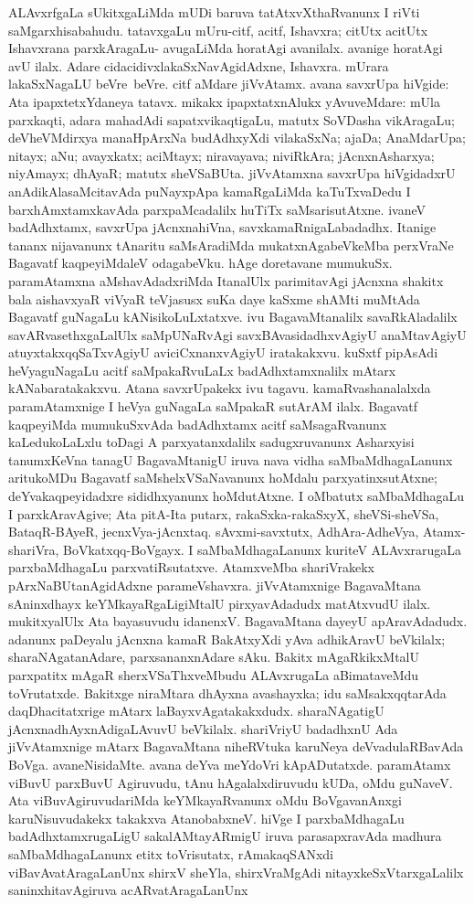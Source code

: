 ALAvxrfgaLa sUkitxgaLiMda mUDi baruva tatAtxvXthaRvanunx I riVti saMgarxhisa\-bahudu. tatavxgaLu mUru-citf, acitf, Ishavxra; citUtx acitUtx Ishavxrana parxkAra\-gaLu- avugaLiMda horatAgi avanilalx. avanige horatAgi avU ilalx. Adare cidacidivxlakaSxNavAgidAdxne, Ishavxra. mUrara lakaSxNagaLU \hbox{beVre beVre}. citf aMdare jiVvAtamx. avana savxrUpa hiVgide: Ata ipapxtetxYdaneya tatavx. mikakx ipapxtatxnAlukx yAvuveMdare: mUla parxkaqti, adara mahadAdi sapatxvikaqtigaLu, matutx SoVDasha vikAragaLu; deVheVMdirxya manaHpArxNa budAdhxyXdi vilakaSxNa; ajaDa; AnaMdarUpa; nitayx; aNu; avayxkatx; aciMtayx; niravayava; niviRkAra; jAcnxnAsharxya; niyAmayx; dhAyaR; matutx sheVSaBUta. jiVvAtamxna savxrUpa hiVgidadxrU anAdikAlasaMcitavAda puNayxpApa kamaRgaLiMda kaTuTxvaDedu I barxhAmxtamxkavAda parxpaMcadalilx huTiTx saMsarisutAtxne. ivaneV badAdhxtamx, savxrUpa jAcnxnahiVna, savxkamaRnigaLabadadhx. Itanige tananx nijavanunx tAnaritu saMsAradiMda mukatxnAgabeVkeMba perxVraNe Bagavatf kaqpeyiMdaleV odagabeVku. hAge doretavane mumukuSx. paramAtamxna aMshavAdadxriMda ItanalUlx parimitavAgi jAcnxna shakitx bala aishavxyaR viVyaR teVjasusx suKa daye kaSxme shAMti muMtAda Bagavatf guNagaLu kANisikoLuLxtatxve. ivu BagavaMtanalilx savaRkAladalilx savARvasethxgaLalUlx saMpUNaRvAgi savxBAvasidadhxvAgiyU anaMtavAgiyU atuyxtakxqqSaTxvAgiyU aviciCxnanxvAgiyU iratakakxvu. kuSxtf pipAsAdi heVyaguNagaLu acitf saMpakaRvuLaLx badAdhxtamxnalilx mAtarx kANabaratakakxvu. Atana savxrUpakekx ivu tagavu. kamaRvashanalalxda paramAtamxnige I heVya guNagaLa saMpakaR sutArAM ilalx. Bagavatf kaqpeyiMda mumukuSxvAda badAdhxtamx acitf saMsagaRvanunx kaLedukoLaLxlu toDagi A parxyatanxdalilx sadugxruvanunx Asharxyisi tanumxKeVna tanagU BagavaMtanigU iruva nava vidha saMbaMdhagaLanunx aritukoMDu Bagavatf saMshelxVSaNavanunx hoMdalu parxyatinxsutAtxne; deYvakaqpeyidadxre sididhxyanunx hoMdutAtxne. I oMbatutx saMbaMdhagaLu I parxkAravAgive; Ata pitA-Ita putarx, rakaSxka-rakaSxyX, sheVSi-sheVSa, BataqR-BAyeR, jecnxVya-jAcnxtaq. sAvxmi-savxtutx, AdhAra-AdheVya, Atamx-shariVra, BoVkatxqq-BoVgayx. I saMbaMdhagaLanunx kuriteV ALAvxrarugaLa parxbaMdhagaLu parxvatiRsutatxve. AtamxveMba shariVrakekx pArxNaBUtanAgidAdxne parameVshavxra. jiVvAtamxnige BagavaMtana sAninxdhayx keYMkayaRgaLigiMtalU pirxyavAdadudx matAtxvudU ilalx. mukitxyalUlx Ata bayasuvudu idanenxV. BagavaMtana dayeyU apAravAdadudx. adanunx paDeyalu jAcnxna kamaR BakAtxyXdi yAva adhikAravU beVkilalx; sharaNAgatanAdare, parxsananxnAdare sAku. Bakitx mAgaRkikxMtalU parxpatitx mAgaR sherxVSaThxveMbudu ALAvxrugaLa aBimataveMdu toVrutatxde. Bakitxge niraMtara dhAyxna avashayxka; idu saMsakxqqtarAda daqDhacitatxrige mAtarx laBayxvAgatakakxdudx. sharaNAgatigU jAcnxnadhAyxnAdigaLAvuvU beVkilalx. shariVriyU badadhxnU Ada jiVvAtamxnige mAtarx BagavaMtana niheRVtuka karuNeya deVvadulaRBavAda BoVga. avaneNisidaMte. avana deYva meYdoVri kApADutatxde. paramAtamx viBuvU parxBuvU Agiruvudu, tAnu hAgalalxdiruvudu kUDa, oMdu guNaveV. Ata viBuvAgiruvudariMda keYMkayaRvanunx oMdu BoVgavanAnxgi karuNisuvudakekx takakxva AtanobabxneV. hiVge I parxbaMdhagaLu badAdhxtamxrugaLigU sakalAMtayARmigU iruva parasapxravAda madhura saMbaMdhagaLanunx etitx toVrisutatx, rAmakaqSANxdi viBavAvatAragaLanUnx shirxV sheYla, shirxVraMgAdi nitayxkeSxVtarxgaLalilx saninxhitavAgiruva acARvatAragaLanUnx 